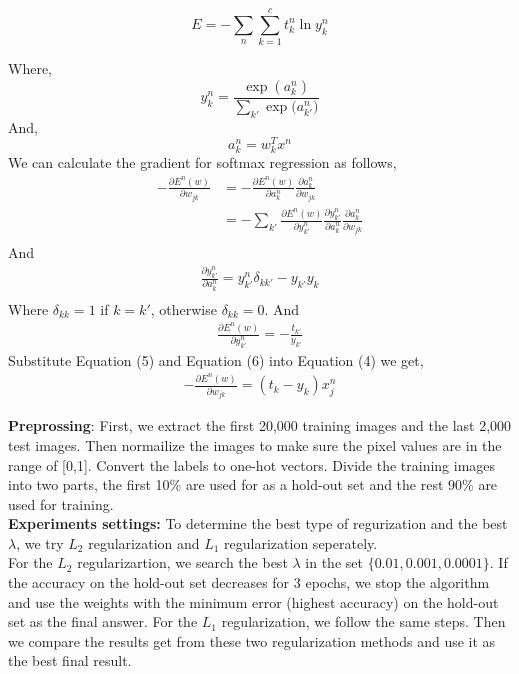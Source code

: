 \documentclass{article} %
\begin{document}
\begin{equation}
	E = - \sum_{n}\sum_{k=1}^{c}t_k^n\ln y_k^n
\end{equation}

Where, 
\begin{equation}
	y_k^n = \frac{\exp{(a_k^n)}}{ \sum_{k'}\exp{(a_{k'}^n})}
\end{equation}
And,
\begin{equation}
	a_k^n = w_k^Tx^n
\end{equation}
We can calculate the gradient for softmax regression as follows,
\begin{equation}
\begin{split}
-\frac{\partial E^n(w)}{\partial w_{jk}}& = - \frac{\partial E^n(w)}{\partial a_k^n}\frac{\partial a_k^n}{\partial w_{jk}} \\
& = -\sum_{k'} \frac{\partial E^n(w)}{\partial y^n_{k'}} \frac{\partial y^n_{k'}}{\partial a^n_k}\frac{\partial a_k^n}{\partial w_{jk}} \\
\end{split}
\end{equation}
And 
\begin{equation}
\begin{split}
\frac{\partial y^n_{k'}}{\partial a^n_k} =  y^n_{k'}\delta_{kk'} - y_{k
'}y_{k}\\
\end{split}
\end{equation}
Where $\delta_{kk} = 1$ if $k = k'$, otherwise $\delta_{kk} = 0$.
And
\begin{equation}
\begin{split}
	\frac{\partial E^n(w)}{\partial y^n_{k'}} = -\frac{t_{k'}}{y_{k'}}
\end{split}
\end{equation}
Substitute Equation (5) and Equation (6) into Equation (4) we get,
\begin{equation}
\begin{split}
	-\frac{\partial E^n(w)}{\partial w_{jk}} = (t_k - y_k)x_j^n 
\end{split}
\end{equation}


\textbf{Preprossing}: First, we extract the first 20,000 training images and the last 2,000 test images. Then normailize the images to make sure the pixel values are in the range of [0,1]. Convert the labels to one-hot vectors. Divide the training images into two parts, the first 10\% are used for as a hold-out set and the rest 90\% are used for training.
\\
\textbf{Experiments settings:} To determine the best type of regurization and the best $\lambda$, we try $L_2$ regularization and $L_1$ regularization seperately.\\
 For the $L_2$ regularizartion, we search the best $\lambda$ in the set $\{0.01, 0.001, 0.0001\}$. If the accuracy on the hold-out set decreases for 3 epochs, we stop the algorithm and use the weights with the minimum error (highest accuracy) on the hold-out set as the final answer. For the $L_1$ regularization, we follow the same steps. Then we compare the results get from these two regularization methods and use it as the best final result.
 
\end{document}
